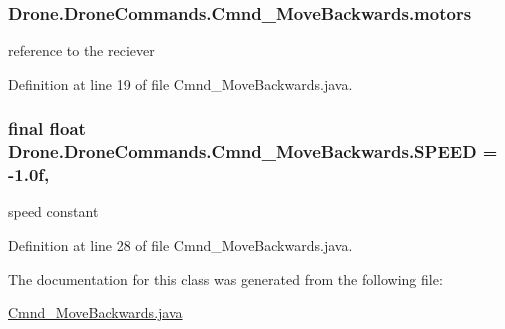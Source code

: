 \subsubsection[{motors}]{ Drone.\+Drone\+Commands.\+Cmnd\+\_\+\+Move\+Backwards.\+motors\hspace{0.3cm}{\ttfamily [private]}}\label{class_drone_1_1_drone_commands_1_1_cmnd___move_backwards_ab2fe68c416f15558165a29a12981fc43}
reference to the reciever 

Definition at line 19 of file Cmnd\+\_\+\+Move\+Backwards.\+java.

\hypertarget{class_drone_1_1_drone_commands_1_1_cmnd___move_backwards_ad521b34d56169e808c17bcdbe37e8da9}{}
\subsubsection[{S\+P\+E\+E\+D}]{\setlength{\rightskip}{0pt plus 5cm}final float Drone.\+Drone\+Commands.\+Cmnd\+\_\+\+Move\+Backwards.\+S\+P\+E\+E\+D = -\/1.\+0f\hspace{0.3cm}{\ttfamily [static]}, {\ttfamily [private]}}\label{class_drone_1_1_drone_commands_1_1_cmnd___move_backwards_ad521b34d56169e808c17bcdbe37e8da9}
speed constant 

Definition at line 28 of file Cmnd\+\_\+\+Move\+Backwards.\+java.



The documentation for this class was generated from the following file\+:\begin{DoxyCompactItemize}
\item 
\hyperlink{_cmnd___move_backwards_8java}{Cmnd\+\_\+\+Move\+Backwards.\+java}\end{DoxyCompactItemize}
